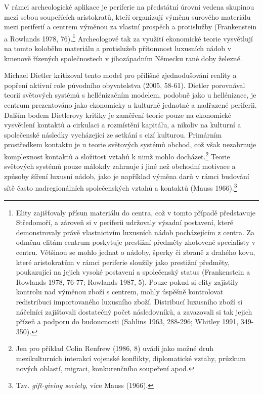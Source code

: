 V rámci archeologické aplikace je periferie na předstátní úrovni vedena skupinou mezi sebou soupeřících aristokratů, kteří organizují výměnu surového materiálu mezi periferií a centrem výměnou za vlastní prospěch a protislužby (Frankenstein a Rowlands 1978, 76).\footnote{Elity zajišťovaly přísun materiálu do centra, což v tomto případě představuje Středomoří, a zároveň si v periferii udržovaly výsadní postavení, které demonstrovaly právě vlastnictvím luxusních nádob pocházejícím z centra. Za odměnu elitám centrum poskytuje prestižní předměty zhotovené specialisty v centru. Většinou se mohlo jednat o nádoby, šperky či zbraně z drahého kovu, které aristokratům v rámci periferie sloužily jako prestižní předměty, poukazující na jejich vysoké postavení a společenský status (Frankenstein a Rowlands 1978, 76-77; Rowlands 1987, 5). Pouze pokud si elity zajistily kontrolu nad výměnou zboží s centrem, mohly úspěšně kontrolovat redistribuci importovaného luxusního zboží. Distribucí luxusního zboží si náčelníci zajišťovali dostatečný počet následovníků, a zavazovali si tak jejich přízeň a podporu do budoucnosti (Sahlins 1963, 288-296; Whitley 1991, 349-350).} Archeologové tak za využití ekonomické teorie vysvětlují na tomto koloběhu materiálu a protislužeb přítomnost luxusních nádob v kmenově řízených společnostech v jihozápadním Německu rané doby železné.

Michael Dietler kritizoval tento model pro přílišné zjednodušování reality a popření aktivní role původního obyvatelstva (2005, 58-61). Dietler porovnával teorii světových systémů s hellénizačním modelem, podobně jako u hellénizace, je centrum prezentováno jako ekonomicky a kulturně jednotné a nadřazené periferii. Dalším bodem Dietlerovy kritiky je zaměření teorie pouze na ekonomické vysvětlení kontaktů a cirkulaci a rozmístění kapitálu, a nikoliv na kulturní a společenské následky vycházející ze setkání s cizí kulturou. Primárním prostředkem kontaktu je u teorie světových systémů obchod, což však nezahrnuje komplexnost kontaktů a složitost vztahů k nimž mohlo docházet.\footnote{Jen pro příklad Colin Renfrew (1986, 8) uvádí jako možné druh mezikulturních interakcí vojenské konflikty, diplomatické vztahy, průzkum nových oblastí, migraci, konkurenčního soupeření apod.} Teorie světových systémů pouze málokdy zahrnuje i jiné než obchodní motivace a způsoby šíření luxusní nádob, jako je například výměna darů v rámci budování sítě často nadregionálních společenských vztahů a kontaktů (Mauss 1966).\footnote{Tzv. {\em gift-giving society}, více Mauss (1966).}

